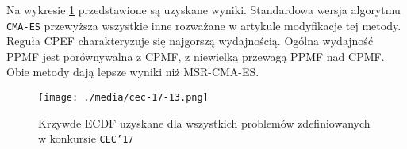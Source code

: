 Na wykresie \ref{cec-17} przedstawione są uzyskane wyniki. Standardowa wersja algorytmu \texttt{CMA-ES} przewyższa wszystkie inne
rozważane w artykule modyfikacje tej metody. Reguła CPEF charakteryzuje się najgorszą wydajnością. Ogólna wydajność PPMF jest porównywalna z CPMF, z niewielką przewagą PPMF nad CPMF. Obie metody dają lepsze wyniki niż MSR-CMA-ES.

\begin{figure}[ht]
\begin{centering}
\texttt{[image: ./media/cec-17-13.png]}
\end{centering}
\caption{Krzywde ECDF uzyskane dla wszystkich problemów zdefiniowanych w konkursie \texttt{CEC'17}}
\label{cec-17}
\end{figure}


